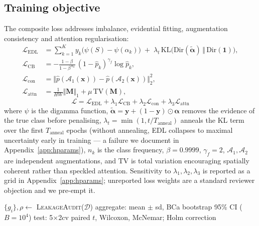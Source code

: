 \documentclass[10pt,twocolumn,a4paper]{article}
\newcommand{\x}{\mathbf{x}}
\newcommand{\y}{\mathbf{y}}
\newcommand{\balpha}{\boldsymbol{\alpha}}
\begin{document}
\subsection{Training objective}
The composite loss addresses imbalance, evidential fitting, augmentation consistency and attention regularisation:
\begin{align}
\mathcal{L}_{\text{EDL}} &= \sum_{k=1}^{K} y_k\big(\psi(S)-\psi(\alpha_k)\big) \;+\; \lambda_t\,\mathrm{KL}\!\big(\mathrm{Dir}(\tilde{\balpha})\,\Vert\,\mathrm{Dir}(\mathbf{1})\big), \\
\mathcal{L}_{\text{CB}} &= -\frac{1-\beta}{1-\beta^{\,n_k}}\,(1-\hat{p}_k)^{\gamma_f}\log \hat{p}_k, \\
\mathcal{L}_{\text{con}} &= \big\Vert \hat{p}(\mathcal{A}_1(\x)) - \hat{p}(\mathcal{A}_2(\x)) \big\Vert_2^2, \\
\mathcal{L}_{\text{attn}} &= \frac{1}{HW}\Vert \mathbf{M}\Vert_1 + \mu\,\mathrm{TV}(\mathbf{M}), \label{eq:attnreg}
\end{align}
\begin{equation}
\boxed{\;\mathcal{L} = \mathcal{L}_{\text{EDL}} + \lambda_1 \mathcal{L}_{\text{CB}} + \lambda_2 \mathcal{L}_{\text{con}} + \lambda_3 \mathcal{L}_{\text{attn}}\;}
\end{equation}
where $\psi$ is the digamma function, $\tilde{\balpha}=\y+(1-\y)\odot\balpha$ removes the evidence of the true class before penalising, $\lambda_t=\min(1,t/T_{\text{anneal}})$ anneals the KL term over the first $T_{\text{anneal}}$ epochs (without annealing, EDL collapses to maximal uncertainty early in training --- a failure we document in Appendix~\ref{app:hparams}), $n_k$ is the class frequency, $\beta=0.9999$, $\gamma_f=2$, $\mathcal{A}_1,\mathcal{A}_2$ are independent augmentations, and $\mathrm{TV}$ is total variation encouraging spatially coherent rather than speckled attention. Sensitivity to $\lambda_1,\lambda_2,\lambda_3$ is reported as a grid in Appendix~\ref{app:hparams}; unreported loss weights are a standard reviewer objection and we pre-empt it.

\begin{algorithm}[t]
\SetAlgoLined
\DontPrintSemicolon
{}
$\{g_i\},\rho \leftarrow$ \textsc{LeakageAudit}($\mathcal{D}$) 
aggregate: mean $\pm$ sd, BCa bootstrap 95\% CI ($B{=}10^4$)\;
test: 5$\times$2cv paired $t$, Wilcoxon, McNemar; Holm correction\;
\caption{CLEAR-Papaya training and evaluation}
\label{alg:train}
\end{algorithm}
\end{document}
